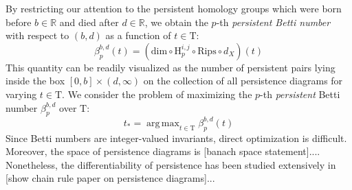 \documentclass[10pt]{article}
\DeclareMathOperator*{\argmax}{arg\,max}
\begin{document}
By restricting our attention to the persistent homology groups which were born before $b \in \mathbb{R}$ and died after $d \in \mathbb{R}$, we obtain the $p$-th \emph{persistent Betti number} with respect to $(b,d)$ as a function of $t \in \mathrm{T}$: 
$$ \beta_{p}^{b,d}(t) = \left(\mathrm{dim} \circ \mathrm{H}_p^{i,j} \circ \mathrm{Rips} \circ d_X \right)(t)$$
This quantity can be readily visualized as the number of persistent pairs lying inside the box $[0, b] \times (d, \infty)$  on the collection of all persistence diagrams for varying $t \in \mathrm{T}$.
We consider the problem of maximizing the $p$-th \emph{persistent} Betti number $\beta^{b,d}_p$ over $\mathrm{T}$: 
\begin{equation}
	t_\ast = \argmax_{t \in \mathrm{T}}	 \beta_{p}^{b,d}(t)
\end{equation}
Since Betti numbers are integer-valued invariants, direct optimization is difficult. Moreover, the space of persistence diagrams is [banach space statement]....
Nonetheless, the differentiability of persistence has been studied extensively in [show chain rule paper on persistence diagrams]...
\end{document}
